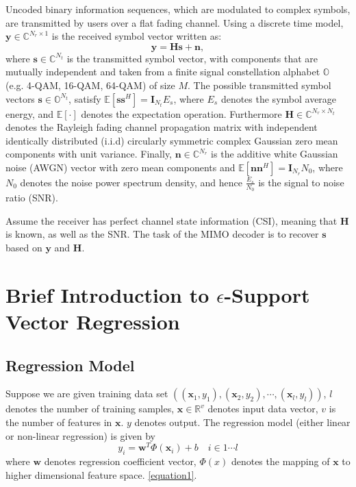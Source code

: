 \documentclass[12pt, draftclsnofoot, onecolumn]{IEEEtran}
\begin{document}
\begin{spacing}{2}
  Uncoded binary information sequences, which are modulated to complex symbols, are transmitted by users over a flat fading channel. Using a discrete time model, $\mathbf{y}\in\mathbb{C}^{N_{r}\times 1}$ is the received symbol vector written as:
\begin{equation}
\mathbf{y}=\mathbf{H}\mathbf{s}+\mathbf{n},   \label{discrete time MIMO system}
\end{equation}
where $\mathbf{s}\in \mathbb{C}^{N_{t}}$ is the transmitted symbol vector, with components that are mutually independent and taken from a finite signal constellation alphabet $\mathbb{O}$ (e.g. 4-QAM, 16-QAM, 64-QAM) of size $M$. The possible transmitted symbol vectors $\mathbf{s}\in \mathbb{O}^{N_{t}}$, satisfy $\mathbb{E}[\mathbf{s}\mathbf{s}^{H}]=\mathbf{I}_{N_t}E_{s}$, where $E_{s}$ denotes the symbol average energy, and $\mathbb{E}[\cdot]$ denotes the expectation operation. Furthermore $\mathbf{H}\in \mathbb{C}^{N_{r}\times N_{t}}$ denotes the Rayleigh fading channel propagation matrix with independent identically distributed (i.i.d) circularly symmetric complex Gaussian zero mean components with unit variance. Finally, $\mathbf{n}\in \mathbb{C}^{N_{r}}$ is the additive white Gaussian noise (AWGN) vector with zero mean components and $\mathbb{E}[\mathbf{n}\mathbf{n}^{H}]=\mathbf{I}_{N_{r}}N_{0}$, where $N_{0}$ denotes the noise power spectrum density, and hence $\frac{E_{s}}{N_{0}}$ is the signal to noise ratio (SNR). 

  Assume the receiver has perfect channel state information (CSI), meaning that $ \mathbf{H}$ is known, as well as the SNR. The task of the MIMO decoder is to recover $\mathbf{s}$ based on $\mathbf{y}$ and $\mathbf{H}$.

\section{Brief Introduction to $\epsilon$-Support Vector Regression}\label{Introduce epsilon SVR}
\subsection{Regression Model}
Suppose we are given training data set $((\mathbf{x}_{1}, y_{1}),(\mathbf{x}_{2},y_{2}),\cdots,(\mathbf{x}_{l},y_{l}))$, $l$ denotes the number of training samples, $\mathbf{x}\in \mathbb{R}^{v}$ denotes input data vector, $v$ is the number of features in $\mathbf{x}$. $y$ denotes output. The regression model (either linear or non-linear regression) is given by 
\begin{equation}
y_{i}=\mathbf{w}^{T}\Phi(\mathbf{x}_{i})+b  \quad i\in 1\cdots l 
\label{equation1}
\end{equation} 
where $\mathbf{w}$ denotes regression coefficient vector, $\Phi(x)$ denotes the mapping of $\mathbf{x}$ to higher dimensional feature space. \ref{equation1}.


\end{spacing}
\end{document}
